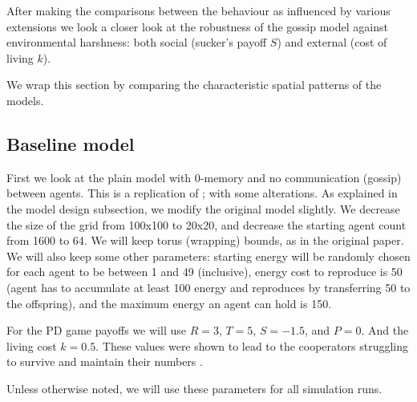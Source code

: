 \documentclass[english]{article}
\begin{document}
After making the comparisons between the behaviour as influenced by various extensions we look a closer look at the robustness of the gossip model against environmental harshness: both social (sucker's payoff $S$) and external (cost of living $k$).

We wrap this section by comparing the characteristic spatial patterns of the models.


\subsection{Baseline model}
First we look at the plain model with 0-memory and no communication (gossip) between agents.
This is a replication of \citet{smaldino}; with some alterations.
As explained in the model design subsection, we modify the original model slightly.
We decrease the size of the grid from 100x100 to 20x20,
and decrease the starting agent count from 1600 to 64.
We will keep torus (wrapping) bounds, as in the original paper.
We will also keep some other parameters:
starting energy will be randomly chosen for each agent to be between 1 and 49 (inclusive),
energy cost to reproduce is 50 (agent has to accumulate at least 100 energy and reproduces by transferring 50 to the offspring),
and the maximum energy an agent can hold is 150.

For the PD game payoffs we will use $R = 3$, $T = 5$, $S = -1.5$, and $P = 0$.
And the living cost $k = 0.5$.
These values were shown to lead to the cooperators struggling to survive
and maintain their numbers \citep{smaldino}.

Unless otherwise noted, we will use these parameters for all simulation runs.
\end{document}
